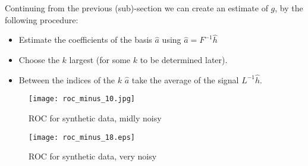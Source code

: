 Continuing from the previous (sub)-section we can create an estimate of \(g\), by the following procedure:

\begin{itemize}
\item Estimate the coefficients of the basis \(\hat{a}\) using \(\hat{a} = F^{-1} \hat{h}\)
\item Choose the \(k\) largest (for some \(k\) to be determined later).
\item Between the indices of the \(k\) \(\hat{a}\) take the average of the signal \(L^{-1}\hat{h}\).
\end{itemize}


\begin{figure}[h]
\centering
\texttt{[image: roc\_minus\_10.jpg]}
\caption{ROC for synthetic data, midly noisy}
\label{fig:hvb}
\end{figure}

\begin{figure}[h]
\centering
\texttt{[image: roc\_minus\_18.eps]}
\caption{ROC for synthetic data, very noisy}
\label{fig:hvb}
\end{figure}